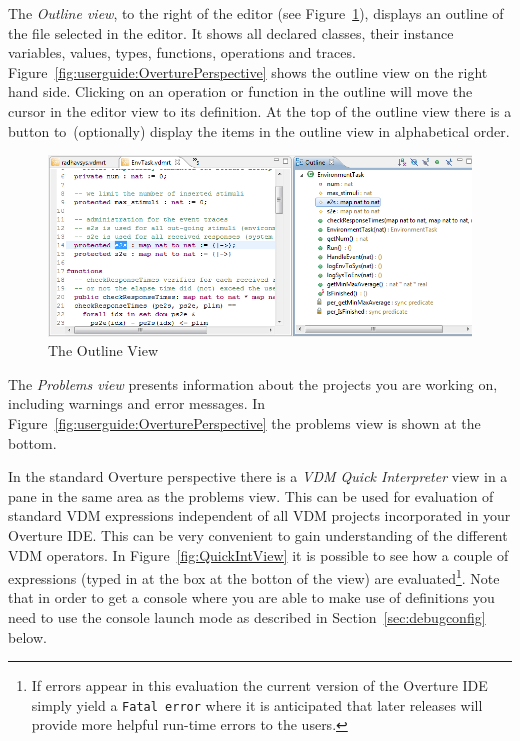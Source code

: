 The \emph{Outline view}, to the right of the editor (see
Figure~\ref{fig:userguide:OutlineView}), displays an outline of the
file selected in the editor. It shows all declared classes, their
instance variables, values, types, functions, operations and traces.
Figure~\ref{fig:userguide:OverturePerspective} shows the outline view
on the right hand side. Clicking on an operation or function in the
outline will move the cursor in the editor view to its definition. At
the top of the outline view there is a button to~(optionally) display
the items in the outline view in alphabetical order.

\begin{figure}[!h]
\begin{center}
  \includegraphics[width=4.5in]{figures/OutlineViewRT}
  \caption[labelInTOC]{The Outline View}
  \label{fig:userguide:OutlineView}
\end{center}
\end{figure}

The \emph{Problems view} presents information about the projects you
are working on, including warnings and error messages. In
Figure~\ref{fig:userguide:OverturePerspective} the problems view is
shown at the bottom.

In the standard Overture perspective there is a \emph{VDM Quick
  Interpreter} view in a pane in the same area as the problems
view. This can be used for evaluation of standard VDM expressions
independent of all VDM projects incorporated in your Overture
IDE. This can be very convenient to gain understanding of the
different VDM operators. In Figure~\ref{fig:QuickIntView} it is
possible to see how a couple of expressions (typed in at the box at
the botton of the view) are evaluated\footnote{If errors appear in
  this evaluation the current version of the Overture IDE simply yield
  a \texttt{Fatal error} where it is anticipated that later releases
  will provide more helpful run-time errors to the users.}. Note that
in order to get a console where you are able to make use of
definitions you need to use the console launch mode as described in
Section~\ref{sec:debugconfig} below. 

